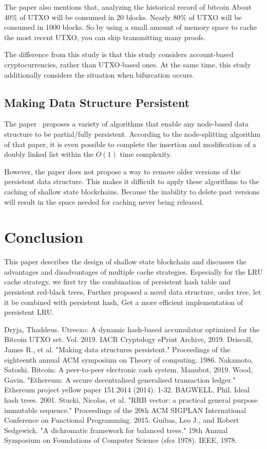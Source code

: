 \documentclass[conference]{IEEEtran}
\begin{document}
The paper also mentions that, analyzing the historical record of bitcoin
About 40\% of UTXO will be consumed in 20 blocks.
Nearly 80\% of UTXO will be consumed in 1000 blocks.
So by using a small amount of memory space to cache the most recent UTXO, you can skip transmitting many proofs.

The difference from this study is that this study considers account-based cryptocurrencies, rather than UTXO-based ones.
At the same time, this study additionally considers the situation when bifurcation occurs.

\subsection{Making Data Structure Persistent}

The paper~\cite{b2} proposes a variety of algorithms that enable any node-based data structure to be partial/fully persistent.
According to the node-splitting algorithm of that paper, it is even possible to complete the insertion and modification of a doubly linked list within the $O(1)$ time complexity.

However, the paper does not propose a way to remove older versions of the persistent data structure.
This makes it difficult to apply these algorithms to the caching of shallow state blockchains.
Because the inability to delete past versions will result in the space needed for caching never being released.

\section{Conclusion}
This paper describes the design of shallow state blockchain and discusses the advantages and disadvantages of multiple cache strategies.
Especially for the LRU cache strategy, 
we first try the combination of persistent hash table and persistent red-black trees,
Further proposed a novel data structure, order tree, let it be combined with persistent hash,
Get a more efficient implementation of persistent LRU.

\begin{thebibliography}{00}
 Dryja, Thaddeus. Utreexo: A dynamic hash-based accumulator optimized for the Bitcoin UTXO set. Vol. 2019. IACR Cryptology ePrint Archive, 2019.
 Driscoll, James R., et al. "Making data structures persistent." Proceedings of the eighteenth annual ACM symposium on Theory of computing. 1986.
 Nakamoto, Satoshi. Bitcoin: A peer-to-peer electronic cash system. Manubot, 2019.
 Wood, Gavin. "Ethereum: A secure decentralised generalised transaction ledger." Ethereum project yellow paper 151.2014 (2014): 1-32.
 BAGWELL, Phil. Ideal hash trees. 2001.
 Stucki, Nicolas, et al. "RRB vector: a practical general purpose immutable sequence." Proceedings of the 20th ACM SIGPLAN International Conference on Functional Programming. 2015.
 Guibas, Leo J., and Robert Sedgewick. "A dichromatic framework for balanced trees." 19th Annual Symposium on Foundations of Computer Science (sfcs 1978). IEEE, 1978.
\end{thebibliography}
\vspace{12pt}
\end{document}
